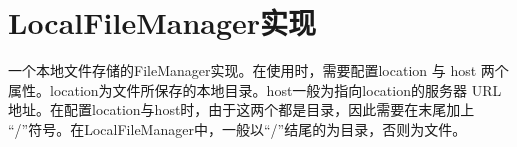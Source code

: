 \section{LocalFileManager实现}
一个本地文件存储的FileManager实现。在使用时，需要配置location 与 host
两个属性。location为文件所保存的本地目录。host一般为指向location的服务器
URL地址。在配置location与host时，由于这两个都是目录，因此需要在末尾加上
``/''符号。在LocalFileManager中，一般以``/''结尾的为目录，否则为文件。
